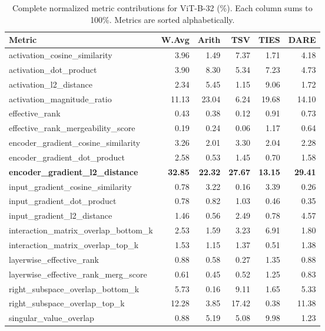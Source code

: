 \begin{table}[h]
\centering
\caption{Complete normalized metric contributions for ViT-B-32 (\%). Each column sums to 100\%. Metrics are sorted alphabetically.}
\label{tab:full_norm_b32}
\small
\begin{tabular}{lrrrrr}
\toprule
\textbf{Metric} & \textbf{W.Avg} & \textbf{Arith} & \textbf{TSV} & \textbf{TIES} & \textbf{DARE} \\
\midrule
activation\_cosine\_similarity & 3.96 & 1.49 & 7.37 & 1.71 & 4.18 \\
activation\_dot\_product & 3.90 & 8.30 & 5.34 & 7.23 & 4.73 \\
activation\_l2\_distance & 2.34 & 5.45 & 1.15 & 9.06 & 1.72 \\
activation\_magnitude\_ratio & 11.13 & 23.04 & 6.24 & 19.68 & 14.10 \\
effective\_rank & 0.43 & 0.38 & 0.12 & 0.91 & 0.73 \\
effective\_rank\_mergeability\_score & 0.19 & 0.24 & 0.06 & 1.17 & 0.64 \\
encoder\_gradient\_cosine\_similarity & 3.26 & 2.01 & 3.30 & 2.04 & 2.28 \\
encoder\_gradient\_dot\_product & 2.58 & 0.53 & 1.45 & 0.70 & 1.58 \\
\textbf{encoder\_gradient\_l2\_distance} & \textbf{32.85} & \textbf{22.32} & \textbf{27.67} & \textbf{13.15} & \textbf{29.41} \\
input\_gradient\_cosine\_similarity & 0.78 & 3.22 & 0.16 & 3.39 & 0.26 \\
input\_gradient\_dot\_product & 0.78 & 0.82 & 1.03 & 0.46 & 0.35 \\
input\_gradient\_l2\_distance & 1.46 & 0.56 & 2.49 & 0.78 & 4.57 \\
interaction\_matrix\_overlap\_bottom\_k & 2.53 & 1.59 & 3.23 & 6.91 & 1.80 \\
interaction\_matrix\_overlap\_top\_k & 1.53 & 1.15 & 1.37 & 0.51 & 1.38 \\
layerwise\_effective\_rank & 0.88 & 0.58 & 0.27 & 1.35 & 0.88 \\
layerwise\_effective\_rank\_merg\_score & 0.61 & 0.45 & 0.52 & 1.25 & 0.83 \\
right\_subspace\_overlap\_bottom\_k & 5.73 & 0.16 & 9.11 & 1.65 & 5.33 \\
right\_subspace\_overlap\_top\_k & 12.28 & 3.85 & 17.42 & 0.38 & 11.38 \\
singular\_value\_overlap & 0.88 & 5.19 & 5.08 & 9.98 & 1.23 \\

\end{tabular}
\end{table}
